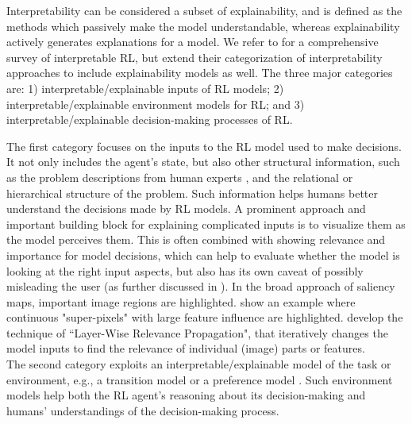 \documentclass[twoside,11pt]{article}
\begin{document}

Interpretability can be considered a subset of explainability, and is defined as the methods which passively make the model understandable, whereas explainability actively generates explanations for a model. We refer to \citep{GlanoisEtAl:2021:SurveyInterpretableRL} for a comprehensive survey of interpretable RL, but extend their categorization of interpretability approaches to include explainability models as well. The three major categories are: 1) interpretable/explainable inputs of RL models; 2) interpretable/explainable environment models for RL; and 3) interpretable/explainable decision-making processes of RL. 

The first category focuses on the inputs to the RL model used to make decisions. It not only includes the agent's state, but also other structural information, such as the problem descriptions from human experts \citep{hasanbeig2021deepsynth}, and the relational \citep{martinez2017relational,battaglia2018relational} or hierarchical structure \citep{andreas2017modular,lyu2019sdrl} of the problem. Such information helps humans better understand the decisions made by RL models. 
A prominent approach and important building block for explaining complicated inputs is to visualize them as the model perceives them. This is often combined with showing relevance and importance for model decisions, which can help to evaluate whether the model is looking at the right input aspects, but also has its own caveat of possibly misleading the user (as further discussed in \cite{EvansEtAl:2021:ExplainabilityParadox}).
In the broad approach of saliency maps, important image regions are highlighted. \citet{LiuEtAl:2018:LinearModelUTrees} show an example where continuous "super-pixels" with large feature influence are highlighted. \citet{Bach:2015:LayerWiseRelevancePropagation} develop the technique of ``Layer-Wise Relevance Propagation", that iteratively changes the model inputs to find the relevance of individual (image) parts or features. \\

The second category exploits an interpretable/explainable model of the task or environment, e.g., a transition model \citep{martinez2016learning,zhu2020object} or a preference model \citep{toro2019learning,icarte2018using}. Such environment models help both the RL agent's reasoning about its decision-making and humans' understandings of the decision-making process. \\
\end{document}
